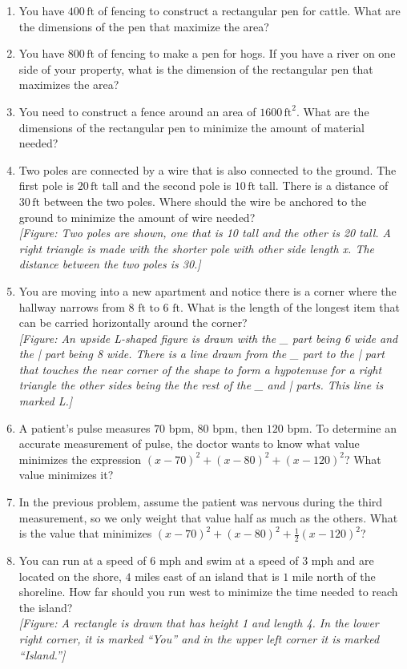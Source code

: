 \documentclass{exercises}
\begin{document}
\begin{enumerate}[resume]
\item You have $400\,\text{ft}$ of fencing to construct a rectangular pen for cattle. What are the dimensions of the pen that maximize the area?
\item You have $800\,\text{ft}$ of fencing to make a pen for hogs. If you have a river on one side of your property, what is the dimension of the rectangular pen that maximizes the area?
\item You need to construct a fence around an area of $1600\,\text{ft}^{2}$. What are the dimensions of the rectangular pen to minimize the amount of material needed?
\item Two poles are connected by a wire that is also connected to the ground. The first pole is $20\,\text{ft}$ tall and the second pole is $10\,\text{ft}$ tall. There is a distance of $30\,\text{ft}$ between the two poles. Where should the wire be anchored to the ground to minimize the amount of wire needed? \\ \textit{[Figure: Two poles are shown, one that is 10 tall and the other is 20 tall. A right triangle is made with the shorter pole with other side length x. The distance between the two poles is 30.]}
\item \techrequired You are moving into a new apartment and notice there is a corner where the hallway narrows from $\text{8 ft to 6 ft}$. What is the length of the longest item that can be carried horizontally around the corner? \\ \textit{[Figure: An upside L-shaped figure is drawn with the \_ part being 6 wide and the | part being 8 wide. There is a line drawn from the \_ part to the | part that touches the near corner of the shape to form a hypotenuse for a right triangle the other sides being the the rest of the \_ and | parts. This line is marked L.]}
\item A patient's pulse measures $\text{70 bpm, 80 bpm, then 120 bpm}$. To determine an accurate measurement of pulse, the doctor wants to know what value minimizes the expression ${(x-70)}^{2}+{(x-80)}^{2}+{(x-120)}^{2}$? What value minimizes it?
\item In the previous problem, assume the patient was nervous during the third measurement, so we only weight that value half as much as the others. What is the value that minimizes ${(x-70)}^{2}+{(x-80)}^{2}+\frac{1}{2}{(x-120)}^{2}$?
\item You can run at a speed of $6$ mph and swim at a speed of $3$ mph and are located on the shore, $4$ miles east of an island that is $1$ mile north of the shoreline. How far should you run west to minimize the time needed to reach the island? \\ \textit{[Figure: A rectangle is drawn that has height 1 and length 4. In the lower right corner, it is marked ``You'' and in the upper left corner it is marked ``Island.'']}
\end{enumerate}
\end{document}
